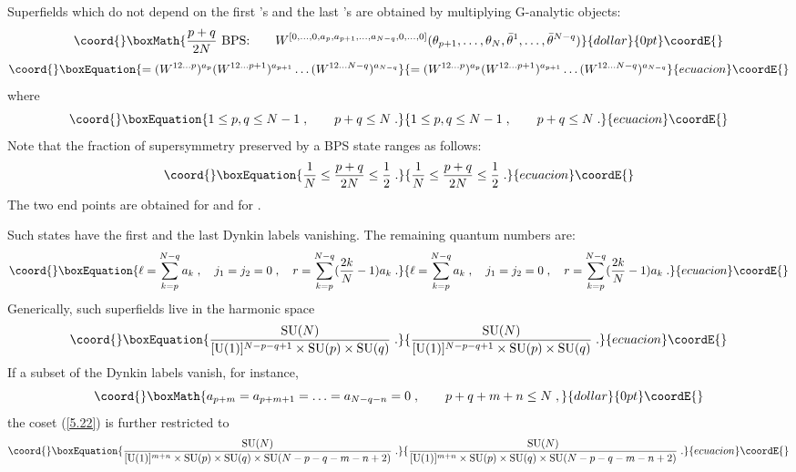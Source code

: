 \documentclass[a4paper,12pt]{article}
\begin{document}
Superfields which do not depend on the first \coordHE{}  \myHighlight{$\theta$}\coordHE{}'s and 
the last \coordHE{}  \myHighlight{$\bar\theta$}\coordHE{}'s are obtained by multiplying 
G-analytic objects: 
$$\coord{}\boxMath{
{p+q\over 2N}\mbox{ BPS:}\qquad 
W^{[0,\ldots,0,a_p,a_{p+1},\ldots,a_{N-q},0,\ldots,0]} 
(\theta_{p+1},\ldots,\theta_{N}, 
\bar\theta^1,\ldots,\bar\theta^{N-q}) 
}{dollar}{0pt}\coordE{}$$
\begin{equation}\coord{}\boxEquation{\label{5.19}
=(W^{12\ldots p})^{a_p}(W^{12\ldots p+1})^{a_{p+1}}\ldots 
(W^{12\ldots N-q})^{a_{N-q}}   
}{=(W^{12\ldots p})^{a_p}(W^{12\ldots p+1})^{a_{p+1}}\ldots 
(W^{12\ldots N-q})^{a_{N-q}}   
}{ecuacion}\coordE{}\end{equation}
where
\begin{equation}\coord{}\boxEquation{\label{5.20}
 1\leq p,q\leq N-1\;, \qquad  p+q\leq N\;.
}{1\leq p,q\leq N-1\;, \qquad  p+q\leq N\;.
}{ecuacion}\coordE{}\end{equation}
Note that the fraction of supersymmetry preserved by a \coordHE{} BPS 
state ranges as follows: 
\begin{equation}\coord{}\boxEquation{\label{5.21'}
{1\over N} \leq {p+q\over 2N} \leq {1\over 2}\;.
}{{1\over N} \leq {p+q\over 2N} \leq {1\over 2}\;.
}{ecuacion}\coordE{}\end{equation}
The two end points are obtained for \coordHE{} and for \coordHE{}.

Such states have the first \coordHE{} and the last \coordHE{}  \coordHE{} Dynkin 
labels vanishing. The remaining quantum numbers are: 
\begin{equation}\coord{}\boxEquation{\label{5.21}
  \ell = \sum_{k=p}^{N-q}a_k\;, \quad j_1=j_2=0\;, \quad r = 
\sum_{k=p}^{N-q}({2k\over N}-1)a_k\;. 
}{\ell = \sum_{k=p}^{N-q}a_k\;, \quad j_1=j_2=0\;, \quad r = 
\sum_{k=p}^{N-q}({2k\over N}-1)a_k\;. 
}{ecuacion}\coordE{}\end{equation}
Generically, such superfields live in the harmonic space
\begin{equation}\coord{}\boxEquation{\label{5.22}
{\mbox{SU}(N)\over [\mbox{U}(1)]^{N-p-q+1}\times 
\mbox{SU}(p)\times \mbox{SU}(q)}\;.   
}{{\mbox{SU}(N)\over [\mbox{U}(1)]^{N-p-q+1}\times 
\mbox{SU}(p)\times \mbox{SU}(q)}\;.   
}{ecuacion}\coordE{}\end{equation}
If a subset of the Dynkin labels vanish, for instance, 
$$\coord{}\boxMath{
a_{p+m}=a_{p+m+1}= \ldots =a_{N-q-n}= 0\;, \qquad p+q+m+n\leq N\;, 
}{dollar}{0pt}\coordE{}$$
the coset (\ref{5.22}) is further restricted to 
\begin{equation}\coord{}\boxEquation{\label{5.23}
{\mbox{SU}(N)\over [\mbox{U}(1)]^{m+n}\times \mbox{SU}(p)\times 
\mbox{SU}(q)\times \mbox{SU}(N-p-q-m-n+2)}\;.   
}{{\mbox{SU}(N)\over [\mbox{U}(1)]^{m+n}\times \mbox{SU}(p)\times 
\mbox{SU}(q)\times \mbox{SU}(N-p-q-m-n+2)}\;.   
}{ecuacion}\coordE{}\end{equation} 
\end{document}
